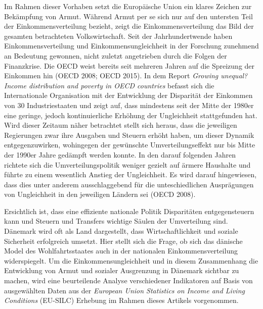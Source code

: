\documentclass[12pt,]{article}
\begin{document}
Im Rahmen dieser Vorhaben setzt die Europäische Union ein klares Zeichen
zur Bekämpfung von Armut. Während Armut per se sich nur auf den
untersten Teil der Einkommensverteilung bezieht, zeigt die
Einkommensverteilung das Bild der gesamten betrachteten Volkswirtschaft.
Seit der Jahrhundertwende haben Einkommensverteilung und
Einkommensungleichheit in der Forschung zunehmend an Bedeutung gewonnen,
nicht zuletzt angetrieben durch die Folgen der Finanzkrise. Die OECD
weist bereits seit mehreren Jahren auf die Spreizung der Einkommen hin
(OECD 2008; OECD 2015). In dem Report \emph{Growing unequal? Income
distribution and poverty in OECD countries} befasst sich die
Internationale Organisation mit der Entwicklung der Disparität der
Einkommen von 30 Industriestaaten und zeigt auf, dass mindestens seit
der Mitte der 1980er eine geringe, jedoch kontinuierliche Erhöhung der
Ungleichheit stattgefunden hat. Wird dieser Zeitaum näher betrachtet
stellt sich heraus, dass die jeweiligen Regierungen zwar ihre Ausgaben
und Steuern erhöht haben, um dieser Dynamik entgegenzuwirken, wohingegen
der gewünschte Umverteilungseffekt nur bis Mitte der 1990er Jahre
gedämpft werden konnte. In den darauf folgenden Jahren richtete sich die
Umverteilungspolitik weniger gezielt auf ärmere Haushalte und führte zu
einem wesentlich Anstieg der Ungleichheit. Es wird darauf hingewiesen,
dass dies unter anderem ausschlaggebend für die unteschiedlichen
Ausprägungen von Ungleichheit in den jeweiligen Ländern sei (OECD 2008).

Ersichtlich ist, dass eine effiziente nationale Politik Disparitäten
entgegensteuern kann und Steuern und Transfers wichtige Säulen der
Umverteilung sind. Dänemark wird oft als Land dargestellt, dass
Wirtschaftlichkeit und soziale Sicherheit erfolgreich umsetzt. Hier
stellt sich die Frage, ob sich das dänische Model des Wohlfahrtsstaates
auch in der nationalen Einkommensverteilung widerspiegelt. Um die
Einkommensungleichheit und in diesem Zusammenhang die Entwicklung von
Armut und sozialer Ausgrenzung in Dänemark sichtbar zu machen, wird eine
beurteilende Analyse verschiedener Indikatoren auf Basis von
ausgewählten Daten aus der \emph{European Union Statistics on Income and
Living Conditions} (EU-SILC) Erhebung im Rahmen dieses Artikels
vorgenommen.
\end{document}

